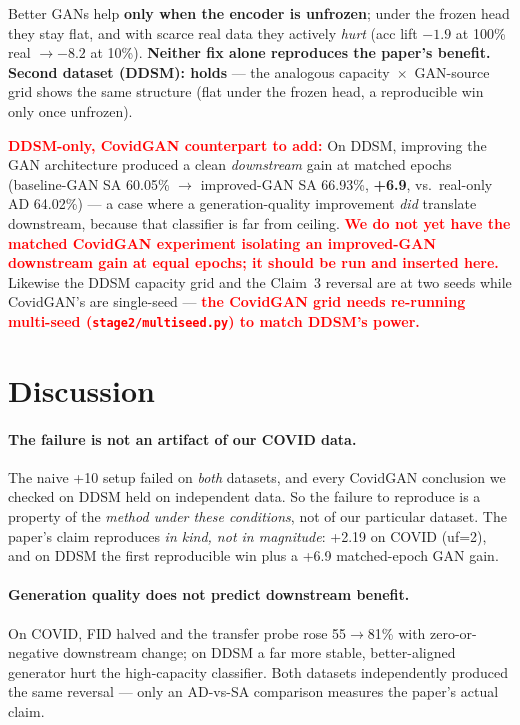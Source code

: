 \documentclass[11pt]{article}
\newcommand{\code}[1]{\texttt{#1}}
\newcommand{\ddsmonly}[1]{\textcolor{red}{\textbf{#1}}}
\begin{document}
\noindent Better GANs help \textbf{only when the encoder is unfrozen}; under the
frozen head they stay flat, and with scarce real data they actively \emph{hurt} (acc
lift $-1.9$ at 100\% real $\to -8.2$ at 10\%). \textbf{Neither fix alone reproduces
the paper's benefit.} \textbf{Second dataset (DDSM): holds} --- the analogous
capacity~$\times$~GAN-source grid shows the same structure (flat under the frozen
head, a reproducible win only once unfrozen).

\medskip
\noindent\ddsmonly{DDSM-only, CovidGAN counterpart to add:} On DDSM, improving the
GAN architecture produced a clean \emph{downstream} gain at matched epochs
(baseline-GAN SA 60.05\% $\to$ improved-GAN SA 66.93\%, \textbf{+6.9}, vs.\ real-only
AD 64.02\%) --- a case where a generation-quality improvement \emph{did} translate
downstream, because that classifier is far from ceiling.
\ddsmonly{We do not yet have the matched CovidGAN experiment isolating an improved-GAN
downstream gain at equal epochs; it should be run and inserted here.} Likewise the
DDSM capacity grid and the Claim~3 reversal are at two seeds while CovidGAN's are
single-seed --- \ddsmonly{the CovidGAN grid needs re-running multi-seed
(\code{stage2/multiseed.py}) to match DDSM's power.}

\section{Discussion}
\paragraph{The failure is not an artifact of our COVID data.} The naive +10 setup
failed on \emph{both} datasets, and every CovidGAN conclusion we checked on DDSM held
on independent data. So the failure to reproduce is a property of the \emph{method
under these conditions}, not of our particular dataset. The paper's claim reproduces
\emph{in kind, not in magnitude}: +2.19 on COVID (uf=2), and on DDSM the first
reproducible win plus a +6.9 matched-epoch GAN gain.

\paragraph{Generation quality does not predict downstream benefit.} On COVID, FID
halved and the transfer probe rose 55$\to$81\% with zero-or-negative downstream
change; on DDSM a far more stable, better-aligned generator hurt the high-capacity
classifier. Both datasets independently produced the same reversal --- only an
AD-vs-SA comparison measures the paper's actual claim.
\end{document}
